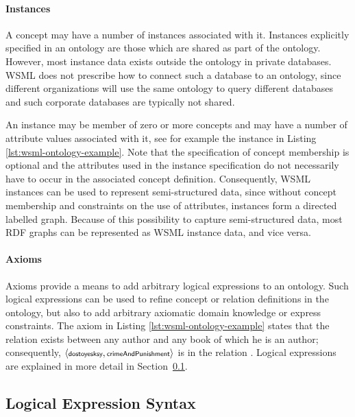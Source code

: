\paragraph{Instances}
A concept may have a number of instances associated with it.
Instances explicitly specified in an ontology are those which are
shared as part of the ontology. However, most instance data exists
outside the ontology in private databases. WSML does not prescribe
how to connect such a database to an ontology, since different
organizations will use the same ontology to query different
databases and such corporate databases are typically not shared.

An instance may be member of zero or more concepts and may have a
number of attribute values associated with it, see for example the
instance  in Listing
\ref{lst:wsml-ontology-example}. Note that the specification of
concept membership is optional and the attributes used in the
instance specification do not necessarily have to occur in the
associated concept definition. Consequently, WSML instances can be
used to represent semi-structured data, since without concept
membership and constraints on the use of attributes, instances form
a directed labelled graph. Because of this possibility to capture
semi-structured data, most RDF graphs can be represented as WSML
instance data, and vice versa.


\paragraph{Axioms} Axioms provide a means to add arbitrary logical
expressions to an ontology. Such logical expressions can be used to
refine concept or relation definitions in the ontology, but also to
add arbitrary axiomatic domain knowledge or express constraints. The
axiom  in Listing
\ref{lst:wsml-ontology-example} states that the relation
 exists between any author and any book of which he
is an author; consequently, $\langle \textsf{\scriptsize dostoyesksy},
\textsf{\scriptsize crimeAndPunishment} \rangle$ is in the relation
. Logical expressions are explained in more detail
in Section~\ref{sec:log-expr-syntax}.

\subsection{Logical Expression Syntax}
\label{sec:log-expr-syntax}

